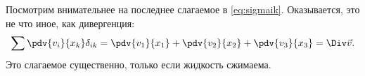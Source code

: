 Посмотрим внимательнее на последнее слагаемое в \eqref{eq:sigmaik}. Оказывается, это не что иное, как дивергенция:
\begin{equation}
    \sum \pdv{v_i}{x_k} \delta_{ik} =
    \pdv{v_1}{x_1}+\pdv{v_2}{x_2}+\pdv{v_3}{x_3} = \Div \vec{v}.
\end{equation}
Это слагаемое существенно, только если жидкость сжимаема.


